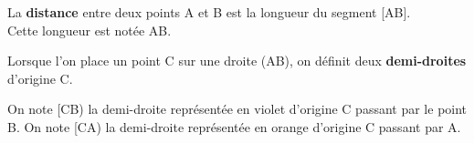 \begin{Définition}
La \textbf{distance} entre deux points A et B est la longueur du segment [AB]. \\
Cette longueur est notée AB.
\end{Définition}

\begin{Définition*}
\begin{minipage}[c]{0.65\textwidth}
Lorsque l'on place un point C sur une droite (AB), on définit deux \textbf{demi-droites} d'origine C.

On note [CB) la demi-droite représentée en violet d'origine C passant par le point B. On note [CA) la demi-droite représentée en orange d'origine C passant par A.
\end{minipage}
\hfill
\begin{minipage}[c]{0.35\textwidth}
\begin{center}
\end{center}
\end{minipage}
\end{Définition*}





